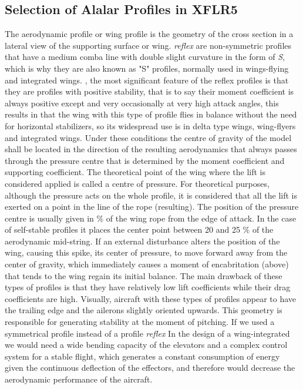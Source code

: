 \subsection{Selection of Alalar Profiles in XFLR5}
The aerodynamic profile or wing profile is the geometry of the cross section in a lateral view of the supporting surface or wing. \textit{reflex} are non-symmetric profiles that have a medium comba line with double slight curvature in the form of \textit{S}, which is why they are also known as "S" profiles, normally used in wings-flying and integrated wings. \cite{gatovolante2015}, the most significant feature of the reflex profiles is that they are profiles with positive stability, that is to say their moment coefficient is always positive except and very occasionally at very high attack angles, this results in that the wing with this type of profile flies in balance without the need for horizontal stabilizers, so its widespread use is in delta type wings, wing-flyers and integrated wings. 
%
Under these conditions the centre of gravity of the model shall be located in the direction of the resulting aerodynamics that always passes through the pressure centre that is determined by the moment coefficient and supporting coefficient. 
%
The theoretical point of the wing where the lift is considered applied is called a centre of pressure. For theoretical purposes, although the pressure acts on the whole profile, it is considered that all the lift is exerted on a point in the line of the rope (resulting). The position of the pressure centre is usually given in $\%$ of the wing rope from the edge of attack. 
%
In the case of self-stable profiles it places the center point between 20 and 25 $\%$ of the aerodynamic mid-string.
%
If an external disturbance alters the position of the wing, causing this spike, its center of pressure, to move forward away from the center of gravity, which immediately causes a moment of encabritation (above) that tends to the wing regain its initial balance. 
%
The main drawback of these types of profiles is that they have relatively low lift coefficients while their drag coefficients are high. 
%
Visually, aircraft with these types of profiles appear to have the trailing edge and the ailerons slightly oriented upwards. This geometry is responsible for generating stability at the moment of pitching. If we used a symmetrical profile instead of a profile \textit{reflex} In the design of a wing-integrated we would need a wide bending capacity of the elevators and a complex control system for a stable flight, which generates a constant consumption of energy given the continuous deflection of the effectors, and therefore would decrease the aerodynamic performance of the aircraft. 

